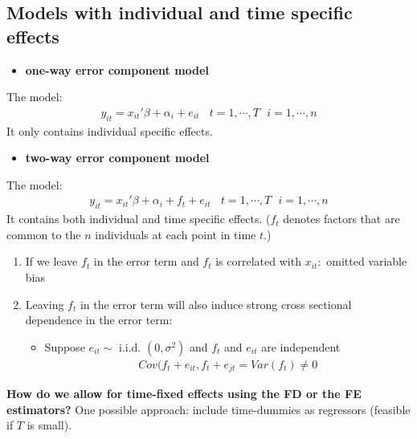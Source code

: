 \documentclass[a4paper,twoside,11pt]{article}
\begin{document}
\subsection{Models with individual and time specific effects}
\begin{itemize}
    \item \textbf{one-way error component model}
\end{itemize}
The model:
\begin{equation*}
\begin{aligned}
y_{it} = x_{it}' \beta + \alpha_i + e_{it} \ \ \ \ t=1,\cdots, T \ \ \ i=1,\cdots ,n
\end{aligned}
\end{equation*}
It only contains individual specific effects.
\begin{itemize}
    \item \textbf{two-way error component model}
\end{itemize}
The model:
\begin{equation*}
\begin{aligned}
y_{it} = x_{it}' \beta + \alpha_i + f_t + e_{it} \ \ \ \ t=1,\cdots, T \ \ \ i=1,\cdots ,n
\end{aligned}
\end{equation*}
It contains both individual and time specific effects. ($f_t$ denotes factors that are common to the $n$ individuals at each point in time $t$.)
\begin{enumerate}
    \item If we leave $f_t$ in the error term and $f_t$ is correlated with $x_{it}:$ omitted variable bias
    \item Leaving $f_t$ in the error term will also induce strong cross sectional dependence in the error term:
    \begin{itemize}
        \item Suppose $e_{it} \sim$ i.i.d. $(0,\sigma^2)$ and $f_t$ and $e_{it}$ are independent 
        \newline
\begin{equation*}
\begin{aligned}
Cov(f_t + e_{it}, f_t + e_{jt} = Var(f_t) \ne 0
\end{aligned}
\end{equation*}
    \end{itemize}
\end{enumerate}
\textbf{How do we allow for time-fixed effects using the FD or the FE estimators?}
\newline
One possible approach: include time-dummies as regressors (feasible if $T$ is small).
\end{document}
